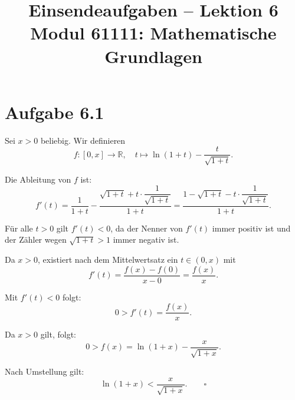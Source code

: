 \documentclass[a4paper,12pt]{article}
\title{Einsendeaufgaben -- Lektion 6\\[0.5em]
\large Modul 61111: Mathematische Grundlagen}
\author{}
\date{}
\begin{document}
\maketitle

\section*{Aufgabe 6.1}

Sei $x > 0$ beliebig. Wir definieren
\[
  f\colon [0, x] \to \mathbb{R}, \quad
  t \mapsto \ln(1+t) - \frac{t}{\sqrt{1+t}}.
\]

Die Ableitung von $f$ ist:
\[
  f'(t) = \frac{1}{1+t} - \frac{\sqrt{1+t} + t \cdot \dfrac{1}{\sqrt{1+t}}}{1+t}
  = \frac{1 - \sqrt{1+t} - t \cdot \dfrac{1}{\sqrt{1+t}}}{1+t}.
\]

Für alle $t > 0$ gilt $f'(t) < 0$, da der Nenner von $f'(t)$ immer positiv ist
und der Zähler wegen $\sqrt{1+t} > 1$ immer negativ ist.

Da $x > 0$, existiert nach dem Mittelwertsatz ein $t \in (0, x)$ mit
\[
  f'(t) = \frac{f(x) - f(0)}{x - 0} = \frac{f(x)}{x}.
\]

Mit $f'(t) < 0$ folgt:
\[
  0 > f'(t) = \frac{f(x)}{x}.
\]

Da $x > 0$ gilt, folgt:
\[
  0 > f(x) = \ln(1+x) - \frac{x}{\sqrt{1+x}}.
\]

Nach Umstellung gilt:
\[
  \ln(1+x) < \frac{x}{\sqrt{1+x}}. \qquad \square
\]
\end{document}
